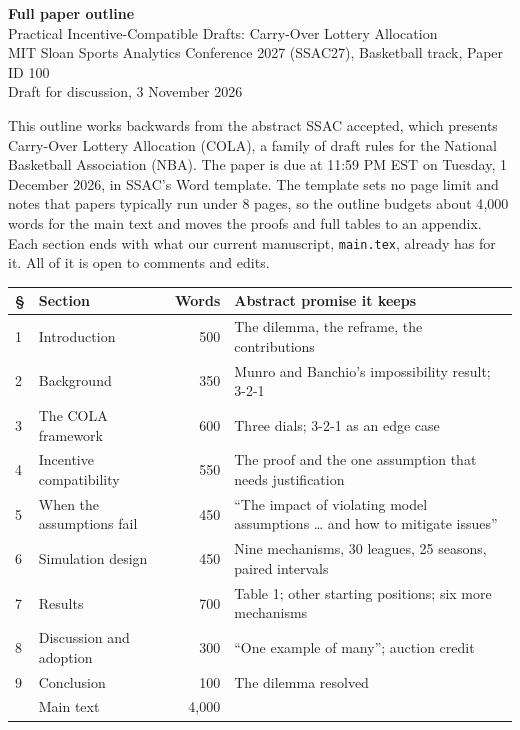 \documentclass[10pt]{article}
\begin{document}
\begin{center}
{\Large\bfseries Full paper outline}\\[3pt]
{\large Practical Incentive-Compatible Drafts: Carry-Over Lottery Allocation}\\[3pt]
MIT Sloan Sports Analytics Conference 2027 (SSAC27), Basketball track, Paper ID 100\\
Draft for discussion, 3 November 2026
\end{center}

This outline works backwards from the abstract SSAC accepted, which presents Carry-Over Lottery Allocation (COLA), a family of draft rules for the National Basketball Association (NBA). The paper is due at 11:59 PM EST on Tuesday, 1 December 2026, in SSAC's Word template. The template sets no page limit and notes that papers typically run under 8 pages, so the outline budgets about 4{,}000 words for the main text and moves the proofs and full tables to an appendix. Each section ends with what our current manuscript, \texttt{main.tex}, already has for it. All of it is open to comments and edits.

\begin{center}
\small
\begin{tabular}{l l r l}
\toprule
\textbf{\S} & \textbf{Section} & \textbf{Words} & \textbf{Abstract promise it keeps} \\
\midrule
1 & Introduction & 500 & The dilemma, the reframe, the contributions \\
2 & Background & 350 & Munro and Banchio's impossibility result; 3-2-1 \\
3 & The COLA framework & 600 & Three dials; 3-2-1 as an edge case \\
4 & Incentive compatibility & 550 & The proof and the one assumption that needs justification \\
5 & When the assumptions fail & 450 & ``The impact of violating model assumptions \ldots{} and how to mitigate issues'' \\
6 & Simulation design & 450 & Nine mechanisms, 30 leagues, 25 seasons, paired intervals \\
7 & Results & 700 & Table 1; other starting positions; six more mechanisms \\
8 & Discussion and adoption & 300 & ``One example of many''; auction credit \\
9 & Conclusion & 100 & The dilemma resolved \\
\midrule
 & Main text & 4{,}000 & \\
\bottomrule
\end{tabular}
\end{center}
\end{document}
